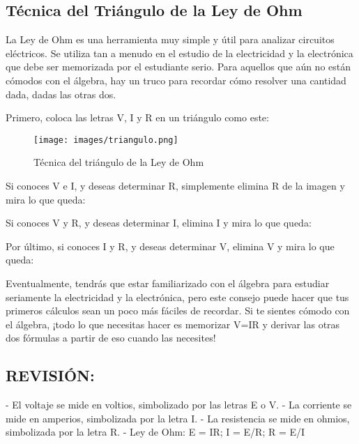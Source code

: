 \documentclass[output=paper, 
colorlinks,
citecolor=brown,
newtxmath
]{langscibook}
\begin{document}
\subsection{Técnica del Triángulo de la Ley de Ohm}

La Ley de Ohm es una herramienta muy simple y útil para analizar circuitos eléctricos. Se utiliza tan a menudo en el estudio de la electricidad y la electrónica que debe ser memorizada por el estudiante serio. Para aquellos que aún no están cómodos con el álgebra, hay un truco para recordar cómo resolver una cantidad dada, dadas las otras dos.

Primero, coloca las letras V, I y R en un triángulo como este:

\begin{figure}[H]
\texttt{[image: images/triangulo.png]}
\caption{Técnica del triángulo de la Ley de Ohm}
\label{fig:unidades}
\end{figure}



Si conoces V e I, y deseas determinar R, simplemente elimina R de la imagen y mira lo que queda:

Si conoces V y R, y deseas determinar I, elimina I y mira lo que queda:

Por último, si conoces I y R, y deseas determinar V, elimina V y mira lo que queda:

Eventualmente, tendrás que estar familiarizado con el álgebra para estudiar seriamente la electricidad y la electrónica, pero este consejo puede hacer que tus primeros cálculos sean un poco más fáciles de recordar. Si te sientes cómodo con el álgebra, ¡todo lo que necesitas hacer es memorizar V=IR y derivar las otras dos fórmulas a partir de eso cuando las necesites!

\subsection{REVISIÓN:}

- El voltaje se mide en voltios, simbolizado por las letras E o V.
- La corriente se mide en amperios, simbolizada por la letra I.
- La resistencia se mide en ohmios, simbolizada por la letra R.
- Ley de Ohm: E = IR; I = E/R; R = E/I
\end{document}
